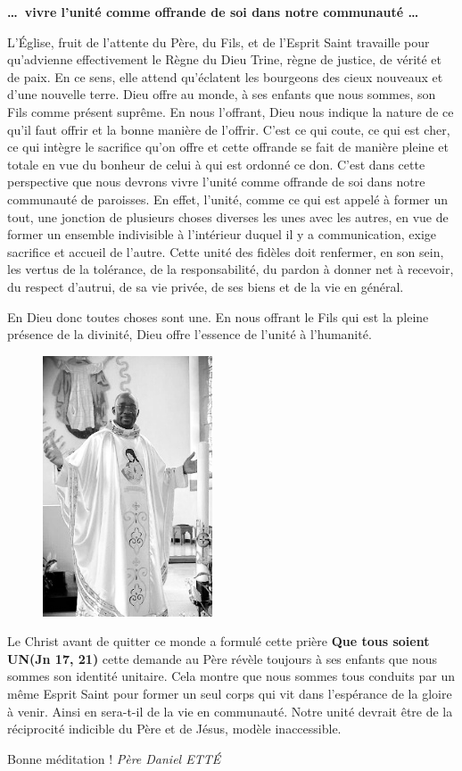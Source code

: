  \begin{center}
 \textbf{\dots\og vivre l’unité comme offrande de soi dans notre communauté \fg \dots}
 \end{center}
L’Église, fruit de l’attente du Père, du Fils, et de l’Esprit Saint travaille pour qu’advienne effectivement le Règne du Dieu Trine, règne de justice, de vérité et de paix.
En ce sens, elle attend qu’éclatent les bourgeons des cieux nouveaux et d’une nouvelle terre. Dieu offre au monde, à ses enfants que nous sommes, son Fils comme présent suprême. En nous l’offrant, Dieu nous indique la nature de ce qu’il faut offrir et la bonne manière de l’offrir. C’est ce qui coute, ce qui est cher, ce qui intègre le sacrifice qu’on offre et cette offrande se fait de manière pleine et totale en vue du bonheur de celui à qui est ordonné ce don.
C’est dans cette perspective que nous devrons vivre l’unité comme offrande de soi dans notre communauté de paroisses. En effet, l’unité, comme ce qui est appelé à former un tout, une jonction de plusieurs choses diverses les unes avec les autres, en vue de former un ensemble indivisible à l’intérieur duquel il y a communication, exige sacrifice et accueil de l’autre. Cette unité des fidèles doit renfermer, en son sein, les vertus de la tolérance, de la responsabilité, du pardon à donner net à recevoir, du respect d’autrui, de sa vie privée, de ses biens et de la vie en général.

En Dieu donc toutes choses sont une. En nous offrant le Fils qui est la pleine présence de la divinité, Dieu offre l’essence de l’unité à l’humanité.
\begin{figure}
\vspace{-0.5cm}
	\includegraphics{../images/standing_daniel.png}
\end{figure}
Le Christ avant de quitter ce monde a formulé cette prière \textbf{\og Que tous soient UN\fg (Jn 17, 21)} cette demande au Père révèle toujours à ses enfants que nous sommes son identité unitaire.
Cela montre que nous sommes tous conduits par un même Esprit Saint pour former un seul corps qui vit dans l’espérance de la gloire à venir. Ainsi en sera-t-il de la vie en communauté. Notre unité devrait être de la réciprocité indicible du Père et de Jésus, modèle inaccessible. 

\begin{flushright}
Bonne méditation !
\textit{Père  Daniel  ETTÉ}
\end{flushright}


